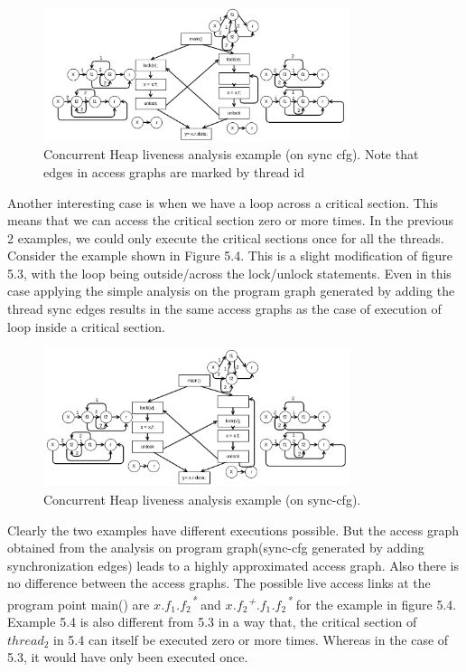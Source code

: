 \begin{figure}
	\centering
	\includegraphics[width=0.8\textwidth]{Figures/rsz_loop_inside.png}
	\caption{Concurrent Heap liveness analysis example (on sync cfg). Note that edges in access graphs are marked by thread id}
	\label{fig:threadidanalysis}
\end{figure}

Another interesting case is when we have a loop across a critical section. This means that we can access the critical section zero or more times. In the previous 2 examples, we could only execute the critical sections once for all the threads. Consider the example shown in Figure 5.4. This is a slight modification of figure 5.3, with the loop being outside/across the lock/unlock statements. Even in this case applying the simple analysis on the program graph generated by adding the thread sync edges results in the same access graphs as the case of execution of loop inside  a critical section. \\

\begin{figure}
	\centering
	\includegraphics[width=0.8\textwidth]{Figures/rsz_loop_outside.png}
	\caption{Concurrent Heap liveness analysis example (on sync-cfg).}
	\label{fig:threadidanalysis}
\end{figure}

Clearly the two examples have different executions possible. But the access graph obtained from the analysis on program graph(sync-cfg generated by adding synchronization edges) leads to a highly approximated access graph. Also there is no difference between the access graphs. The possible live access links at the program point main() are \emph{$x$.$f_1$.$f_2$\textsuperscript{*}} and \emph{$x$.$f_2$\textsuperscript{+}.$f_1$.$f_2$\textsuperscript{*}} for the example in figure 5.4. Example 5.4 is also different from 5.3 in a way that, the critical section of $thread_2$ in 5.4 can itself be executed zero or more times. Whereas in the case of 5.3, it would have only been executed once. \\

